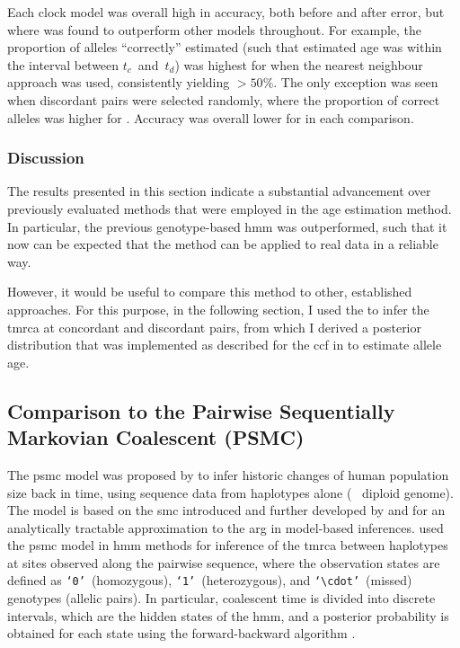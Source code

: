 %

%

Each clock model was overall high in accuracy, both before and after error, but where \ClockC was found to outperform other models throughout.
For example, the proportion of alleles ``correctly'' estimated (such that estimated age was within the interval between $t_c$~and~$t_d$) was highest for \ClockC when the nearest neighbour approach was used, consistently yielding $>50\%$.
The only exception was seen when discordant pairs were selected randomly, where the proportion of correct alleles was higher for \ClockR.
Accuracy was overall lower for \ClockM in each comparison.

%

%

%
\subsubsection{Discussion}
%

The results presented in this section indicate a substantial advancement over previously evaluated methods that were employed in the age estimation method.
In particular, the previous genotype-based \gls{hmm} was outperformed, such that it now can be expected that the method can be applied to real data in a reliable way.

However, it would be useful to compare this method to other, established approaches.
For this purpose, in the following section, I used the  to infer the \gls{tmrca} at concordant and discordant pairs, from which I derived a posterior distribution that was implemented as described for the \gls{ccf} in  to estimate allele age.



%
\subsection{Comparison to the Pairwise Sequentially Markovian Coalescent (PSMC)}
\label{sec:psmc_eval}
%

The \gls{psmc} model was proposed by \citet{Li:2011ez} to infer historic changes of human population size back in time, using sequence data from  haplotypes alone (\ie~ diploid genome).
The model is based on the \gls{smc} introduced and further developed by \citet{McVean:2005ho} and \citet{marjoram2006fast} for an analytically tractable approximation to the \gls{arg} in model-based inferences.
 used the \Gls{psmc} model in \gls{hmm} methods for inference of the \gls{tmrca} between  haplotypes at sites observed along the pairwise sequence, where the observation states are defined as \texttt{`0'}~(homozygous), \texttt{`1'}~(heterozygous), and \texttt{`$\cdot$'}~(missed) genotypes (\ie allelic pairs).
In particular, coalescent time is divided into discrete intervals, which are the hidden states of the \gls{hmm}, and a posterior probability is obtained for each state using the forward-backward algorithm \citep[\eg, see][]{Rabiner:1989hs}.

